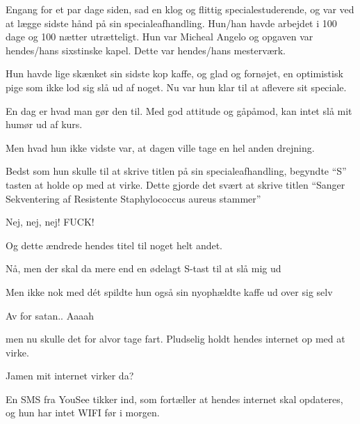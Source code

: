 \documentclass[a4paper,11pt]{article}
\begin{document}
\begin{sketch}



 Engang for et par dage siden, sad en klog og flittig specialestuderende, og var ved at lægge sidste hånd på sin specialeafhandling. Hun/han havde arbejdet i 100 dage og 100 nætter utrætteligt. Hun var Micheal Angelo og opgaven var hendes/hans sixstinske kapel. Dette var hendes/hans mesterværk. 


 Hun havde lige skænket sin sidste kop kaffe, og glad og fornøjet, en optimistisk pige som ikke lod sig slå ud af noget. Nu var hun klar til at aflevere sit speciale.

 En dag er hvad man gør den til. Med god attitude og gåpåmod, kan intet slå mit humør ud af kurs.

 Men hvad hun ikke vidste var, at dagen ville tage en hel anden drejning. 

 Bedst som hun skulle til at skrive titlen på sin specialeafhandling, begyndte “S” tasten at holde op med at virke. Dette gjorde det svært at skrive titlen “Sanger Sekventering af Resistente Staphylococcus aureus stammer” 


 Nej, nej, nej! FUCK! 

 Og dette ændrede hendes titel til noget helt andet.


 Nå, men der skal da mere end en ødelagt S-tast til at slå mig ud

 Men ikke nok med dét spildte hun også sin nyophældte kaffe ud over sig selv

 Av for satan.. Aaaah 

 men nu skulle det for alvor tage fart. Pludselig holdt hendes internet op med at virke. 

 Jamen mit internet virker da? 

 En SMS fra YouSee tikker ind, som fortæller at hendes internet skal opdateres, og hun har intet WIFI før i morgen.


\end{sketch}
\end{document}
